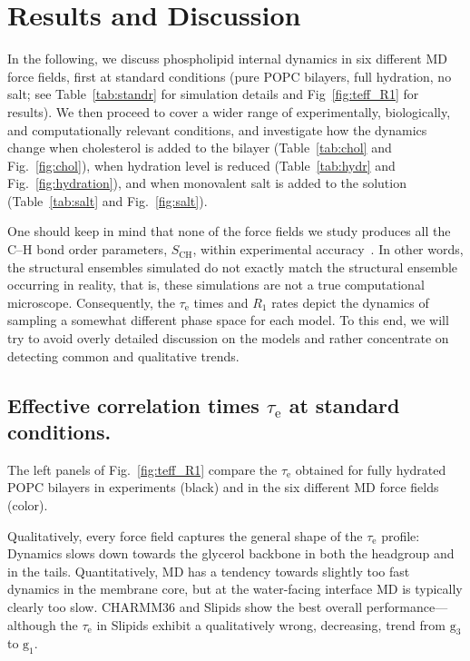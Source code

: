 \documentclass[journal=jpcbfk,manuscript=article,layout=twocolumn]{achemso}
\begin{document}
\section{Results and Discussion}

In the following, we discuss phospholipid internal dynamics in
six different MD force fields, %
first at standard conditions (pure POPC bilayers, full hydration, no salt;
see Table~\ref{tab:standr} for simulation details and Fig~\ref{fig:teff_R1} for results).
%
We then proceed to
cover a wider range of experimentally, biologically, and computationally relevant conditions, and investigate how the dynamics change when cholesterol is added to the bilayer (Table~\ref{tab:chol} and Fig.~\ref{fig:chol}), when hydration level is reduced (Table~\ref{tab:hydr} and Fig.~\ref{fig:hydration}), and when monovalent salt is added to the solution (Table~\ref{tab:salt} and Fig.~\ref{fig:salt}).

One should keep in mind that none of the force fields we study
produces all the C--H bond order parameters, $S_\mathrm{CH}$, within experimental accuracy~\cite{botan15}.
%
%
In other words, the structural ensembles simulated do not exactly match
the structural ensemble occurring in reality, that is, these simulations are not a true computational microscope.
%
Consequently, the
$\tau_\mathrm{e}$ times and $R_1$ rates
depict the dynamics of sampling a somewhat different phase space
for each model. %
%
To this end,
we will try to avoid overly detailed discussion on the models and rather concentrate on detecting common and qualitative trends.


\subsection*{Effective correlation times $\tau_\mathrm e$ at standard conditions.}
The left panels of Fig.~\ref{fig:teff_R1} compare the $\tau_\mathrm{e}$ obtained for fully hydrated POPC bilayers in experiments (black) and in the six different MD force fields (color).

Qualitatively, every force field captures the general shape of the $\tau_\mathrm{e}$ profile: Dynamics slows down towards the glycerol backbone in both the headgroup and in the tails. Quantitatively, MD has a tendency towards
slightly too fast dynamics in the membrane core,
but
at the water-facing interface MD is typically clearly too slow.
CHARMM36 and Slipids show the best overall performance---although the $\tau_\mathrm{e}$ in Slipids exhibit a qualitatively wrong, decreasing, trend from $\mathrm g_{3}$ to $\mathrm g_{1}$.
\end{document}
